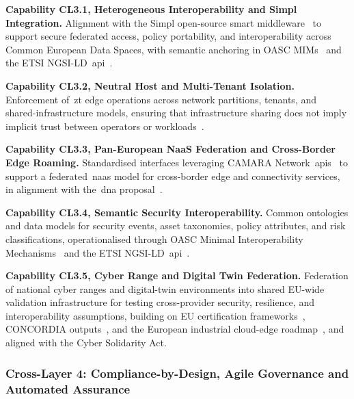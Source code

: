 \documentclass{ieeeaccess}
\begin{document}
\textbf{Capability CL3.1, Heterogeneous Interoperability and Simpl Integration.} Alignment with the Simpl open-source smart middleware~\cite{ecsimpl} to support secure federated access, policy portability, and interoperability across Common European Data Spaces, with semantic anchoring in OASC MIMs~\cite{oascmim5} and the ETSI NGSI-LD~\gls{api}~\cite{etsingsild}.

\textbf{Capability CL3.2, Neutral Host and Multi-Tenant Isolation.} Enforcement of~\gls{zt} edge operations across network partitions, tenants, and shared-infrastructure models, ensuring that infrastructure sharing does not imply implicit trust between operators or workloads~\cite{rose2020zta,chandramouli2023zta}.

\textbf{Capability CL3.3, Pan-European NaaS Federation and Cross-Border Edge Roaming.} Standardised interfaces leveraging CAMARA Network~\glspl{api}~\cite{camara2025} to support a federated~\gls{naas} model for cross-border edge and connectivity services, in alignment with the~\gls{dna} proposal~\cite{eudna2026}.

\textbf{Capability CL3.4, Semantic Security Interoperability.} Common ontologies and data models for security events, asset taxonomies, policy attributes, and risk classifications, operationalised through OASC Minimal Interoperability Mechanisms~\cite{oascmim5} and the ETSI NGSI-LD~\gls{api}~\cite{etsingsild}.

\textbf{Capability CL3.5, Cyber Range and Digital Twin Federation.} Federation of national cyber ranges and digital-twin environments into shared EU-wide validation infrastructure for testing cross-provider security, resilience, and interoperability assumptions, building on EU certification frameworks~\cite{eucsa}, CONCORDIA outputs~\cite{concordia2022}, and the European industrial cloud-edge roadmap~\cite{ecroadmap2024}, and aligned with the Cyber Solidarity Act.

\subsubsection{Cross-Layer 4: Compliance-by-Design, Agile Governance and Automated Assurance}
\label{sec:CL4}
\end{document}
